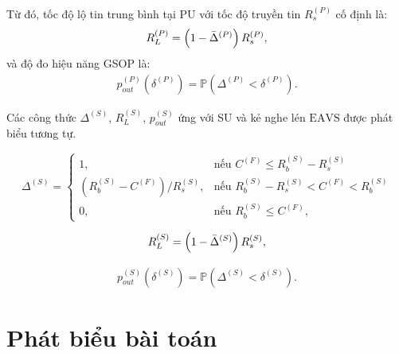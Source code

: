 \documentclass[../main.tex]{subfiles}
\begin{document}
Từ đó, tốc độ lộ tin trung bình tại PU với tốc độ truyền tin $R_s^{(P)}$ cố định là:
\begin{equation}\label{rlp}
R_L^{(P)} = \left(1-{\Bar{\Delta}}^{(P)}\right)R_s^{(P)},
\end{equation}
và độ đo hiệu năng GSOP là:
\begin{align}\label{gsopp}
p_{out}^{(P)}\left(\delta^{(P)}\right) = \mathbb{P}\left(\Delta^{(P)} < \delta^{(P)}\right).
\end{align}

Các công thức $\Delta^{(S)}$, $R_L^{(S)}$, $p_{out}^{(S)}$ ứng với SU và kẻ nghe lén $\text{EAVS}$ được phát biểu tương tự.

\begin{equation}\label{deltas}
\Delta^{(S)}=
\begin{cases}
1,& \text{nếu } C^{(F)}\leq R_b^{(S)} - R_s^{(S)}\\
\left(R_b^{(S)} - C^{(F)}\right)/R_s^{(S)},& \text{nếu } R_b^{(S)} - R_s^{(S)} < C^{(F)} < R_b^{(S)}\\
0 ,& \text{nếu } R_b^{(S)} \leq C^{(F)},
\end{cases}
\end{equation}

\begin{equation}\label{rls}
R_L^{(S)} = \left(1-{\Bar{\Delta}}^{(S)}\right)R_s^{(S)},
\end{equation}

\begin{align}\label{gsops}
p_{out}^{(S)}\left(\delta^{(S)}\right) = \mathbb{P}\left(\Delta^{(S)} < \delta^{(S)}\right).
\end{align}

\section{Phát biểu bài toán}
\end{document}
